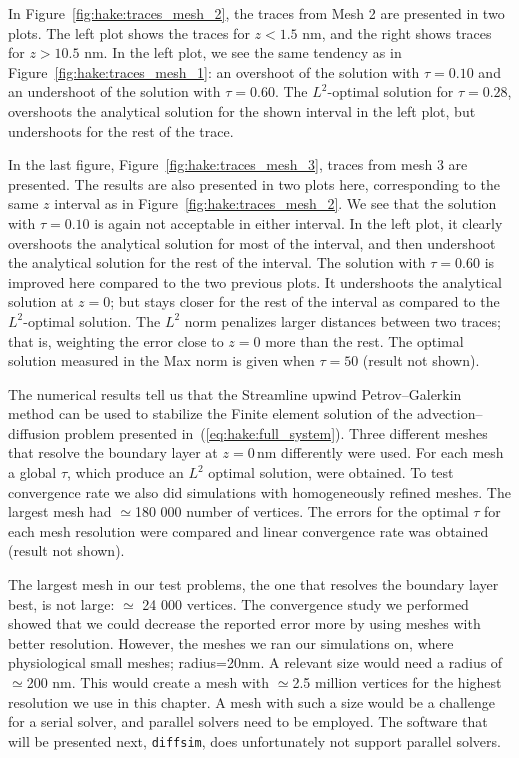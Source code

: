 In Figure~\ref{fig:hake:traces_mesh_2}, the traces from Mesh 2 are
presented in two plots. The left plot shows the traces for $z<1.5$ nm,
and the right shows traces for $z>10.5$ nm. In the left plot, we see
the same tendency as in Figure~\ref{fig:hake:traces_mesh_1}: an
overshoot of the solution with $\tau=0.10$ and an undershoot of the
solution with $\tau=0.60$. The $L^2$-optimal solution for $\tau=0.28$,
overshoots the analytical solution for the shown interval in the left
plot, but undershoots for the rest of the trace.

In the last figure, Figure~\ref{fig:hake:traces_mesh_3}, traces from
mesh 3 are presented. The results are also presented in two plots
here, corresponding to the same $z$ interval as in
Figure~\ref{fig:hake:traces_mesh_2}. We see that the solution with
$\tau=0.10$ is again not acceptable in either interval. In the left
plot, it clearly overshoots the analytical solution for most of the
interval, and then undershoot the analytical solution for the rest of
the interval. The solution with $\tau=0.60$ is improved here compared
to the two previous plots. It undershoots the analytical solution at
$z=0$; but stays closer for the rest of the interval as compared to
the $L^2$-optimal solution. The $L^2$ norm penalizes larger distances
between two traces; that is, weighting the error close to $z=0$ more
than the rest. The optimal solution measured in the Max norm is given
when $\tau=50$ (result not shown).

The numerical results tell us that the Streamline upwind
Petrov--Galerkin method can be used to stabilize the Finite element
solution of the advection--diffusion problem presented
in~(\ref{eq:hake:full_system}). Three different meshes that resolve
the boundary layer at $z=0\,\mathrm{nm}$ differently were used. For
each mesh a global $\tau$, which produce an $L^2$ optimal solution,
were obtained. To test convergence rate we also did simulations with
homogeneously refined meshes. The largest mesh had $\simeq$180 000
number of vertices. The errors for the optimal $\tau$ for each mesh
resolution were compared and linear convergence rate was obtained
(result not shown).

The largest mesh in our test problems, the one that resolves the
boundary layer best, is not large: $\simeq$ 24 000 vertices. The
convergence study we performed showed that we could decrease the
reported error more by using meshes with better resolution. However,
the meshes we ran our simulations on, where physiological small
meshes; radius=20nm. A relevant size would need a radius of
$\simeq$200 nm. This would create a mesh with $\simeq$2.5 million
vertices for the highest resolution we use in this chapter. A mesh
with such a size would be a challenge for a serial solver, and
parallel solvers need to be employed. The software that will be
presented next, \texttt{diffsim}, does unfortunately not support
parallel solvers.

